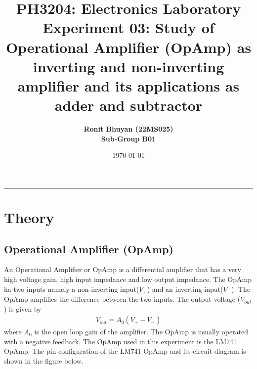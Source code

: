 \documentclass[12pt]{article}
\title{
  \vspace{-2cm}
  \Huge \textbf{PH3204: Electronics Laboratory} \\[0.4cm]
  \Large \textbf{Experiment 03:  Study of Operational Amplifier 
  (OpAmp) as inverting and non-inverting amplifier and
  its applications as adder and subtractor}
}
\author{
  \textbf{Ronit Bhuyan (22MS025)} \\[0.2cm]
  \textbf{Sub-Group B01}
}
\date{\today}
\begin{document}
\maketitle

\tableofcontents
\noindent\rule{\textwidth}{0.4pt}
\newpage

\section{Theory}


\subsection{Operational Amplifier (OpAmp)}
An Operational Amplifier or OpAmp is a differential amplifier that has a very high voltage gain, high input impedance and low output impedance. The OpAmp ha two inputs namely a non-inverting input($V_+$) and an inverting input($V_-$). The OpAmp amplifies the difference between the two inputs. The output voltage ($V_{out}$) is given by 
\begin{align*}
    V_{out} = A_0(V_+ - V_-)
\end{align*} 
where $A_0$ is the open loop gain of the amplifier. The OpAmp is usually operated with a negative feedback. The OpAmp used in this experiment is the LM741 OpAmp. The pin configuration of the LM741 OpAmp and its circuit diagram is shown in the figure below.
\end{document}
